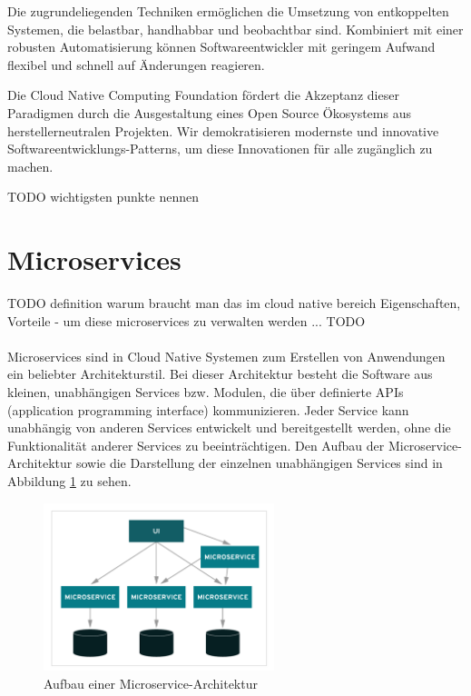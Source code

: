 Die zugrundeliegenden Techniken ermöglichen die Umsetzung von entkoppelten Systemen, die belastbar, handhabbar und beobachtbar sind. Kombiniert mit einer robusten Automatisierung können Softwareentwickler mit geringem Aufwand flexibel und schnell auf Änderungen reagieren.

Die Cloud Native Computing Foundation fördert die Akzeptanz dieser Paradigmen durch die Ausgestaltung eines Open Source Ökosystems aus herstellerneutralen Projekten. Wir demokratisieren modernste und innovative Softwareentwicklungs-Patterns, um diese Innovationen für alle zugänglich zu machen.

TODO wichtigsten punkte nennen


\section{Microservices}
TODO definition
warum braucht man das im cloud native bereich
Eigenschaften, Vorteile
- um diese microservices zu verwalten werden ... TODO\\
\\
Microservices sind in Cloud Native Systemen zum Erstellen von Anwendungen ein beliebter Architekturstil. Bei dieser Architektur besteht die Software aus kleinen, unabhängigen Services bzw. Modulen, die über definierte APIs (application programming interface) kommunizieren. Jeder Service kann unabhängig von anderen Services entwickelt und bereitgestellt werden, ohne die Funktionalität anderer Services zu beeinträchtigen. Den Aufbau der Microservice-Architektur sowie die Darstellung der einzelnen unabhängigen Services sind in Abbildung \ref{micro} zu sehen.\\
\begin{figure}[bth] 
	\centering
	\includegraphics[width=0.6\textwidth]{Graphics/Microservice.png}
	\caption{Aufbau einer Microservice-Architektur}
	\label{micro}
\end{figure}\\
